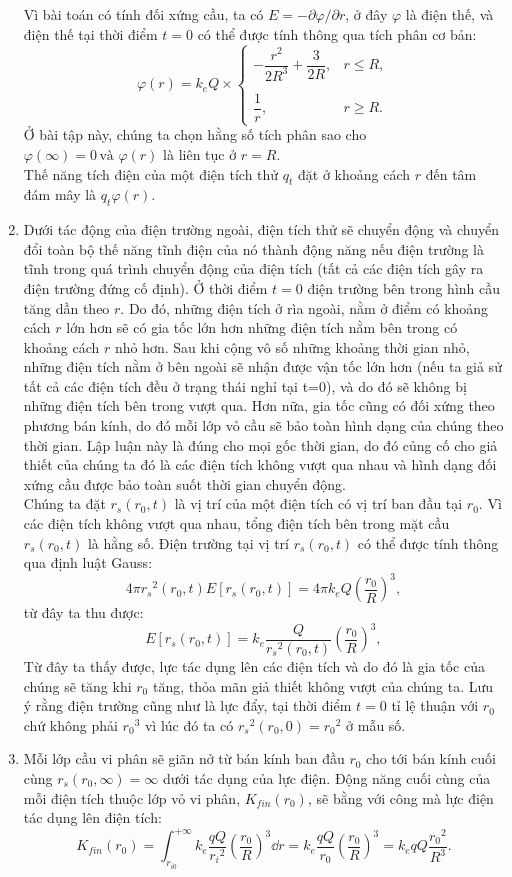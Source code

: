 \begin{loigiai}
\begin{enumerate}[1)]
Vì bài toán có tính đối xứng cầu, ta có $E=-\partial \varphi/\partial r$, ở đây $\varphi$ là điện thế, và điện thế tại thời điểm $t=0$ có thể được tính thông qua tích phân cơ bản:
      \[\varphi(r) = k_e Q \times \left\{ \begin{array}{cc} -\dfrac{r^2}{2R^3} +\dfrac{3}{2R}, & r\leq R, \\
      \\
  \dfrac{1}{r}, & r\geq R. \end{array} \right. \tag{2}\]
Ở bài tập này, chúng ta chọn hằng số tích phân sao cho $\varphi(\infty) =0 \,\text{và}\,\, \varphi(r)$ là liên tục ở $ r=R$.\\ Thế năng tích điện của một điện tích thử $q_t$ đặt ở khoảng cách $r$ đến tâm đám mây là $q_t \varphi (r )$.
  \item Dưới tác động của điện trường ngoài, điện tích thử sẽ chuyển động và chuyển đổi toàn bộ thế năng tĩnh điện của nó thành động năng nếu điện trường là tĩnh trong quá trình chuyển động của điện tích (tất cả các điện tích gây ra điện trường đứng cố định). Ở thời điểm $t=0$ điện trường bên trong hình cầu tăng dần theo $r$. Do đó, những điện tích ở rìa ngoài, nằm ở điểm có khoảng cách $r$ lớn hơn sẽ có gia tốc lớn hơn những điện tích nằm bên trong có khoảng cách $r$ nhỏ hơn. Sau khi cộng vô số những khoảng thời gian nhỏ, những điện tích nằm ở bên ngoài sẽ nhận được vận tốc lớn hơn (nếu ta giả sử tất cả các điện tích đều ở trạng thái nghỉ tại t=0), và do đó sẽ không bị những điện tích bên trong vượt qua. Hơn nữa, gia tốc cũng có đối xứng theo phương bán kính, do đó mỗi lớp vỏ cầu sẽ bảo toàn hình dạng của chúng theo thời gian. Lập luận này là đúng cho mọi gốc thời gian, do đó củng cố cho giả thiết của chúng ta đó là các điện tích không vượt qua nhau và hình dạng đối xứng cầu được bảo toàn suốt thời gian chuyển động.\\
Chúng ta đặt $r_s(r_0,t)$ là vị trí của một điện tích có vị trí ban đầu tại $r_0$. Vì các điện tích không vượt qua nhau, tổng điện tích bên trong mặt cầu $r_s(r_0,t)$ là hằng số. Điện trường tại vị trí $r_s(r_0,t)$ có thể được tính thông qua định luật Gauss:
       \[4\pi{r_s}^2 (r_0,t)E[r_s(r_0,t)]=4\pi k_e Q \left(\dfrac{r_0}{R}\right)^3, \tag{3} \] 
từ đây ta thu được: 
    \[E[r_s(r_0,t)] = k_e \dfrac{Q}{{r_s}^2 (r_0,t)}\left(\dfrac{r_0}{R}\right)^3, \tag{4} \]
Từ đây ta thấy được, lực tác dụng lên các điện tích và do đó là gia tốc của chúng sẽ tăng khi $r_0$ tăng, thỏa mãn giả thiết không vượt của chúng ta. Lưu ý rằng điện trường cũng như là lực đẩy, tại thời điểm $t=0$ tỉ lệ thuận với $r_0$ chứ không phải ${r_0}^3$ vì lúc đó ta có ${r_s}^2(r_0,0) = {r_0}^2$ ở mẫu số.
  \item Mỗi lớp cầu vi phân sẽ giãn nở từ bán kính ban đầu $r_0$ cho tới bán kính cuối cùng $r_s(r_0, \infty)= \infty$ dưới tác dụng của lực điện. Động năng cuối cùng của mỗi điện tích thuộc lớp vỏ vi phân, $K_{fin}(r_0)$, sẽ bằng với công mà lực điện tác dụng lên điện tích:
     \[ K_{fin}(r_0) = \int_{r_{i0}}^{+\infty} k_e \dfrac{qQ}{{r_i}^2}\left(\dfrac{r_0}{R}\right)^3 \dd r = k_e \dfrac{qQ}{r_0} \left(\dfrac{r_0}{R}\right)^3 = k_e qQ \dfrac{{r_0}^2}{R^3}. \tag{5} \] 


\end{enumerate}
\end{loigiai}
